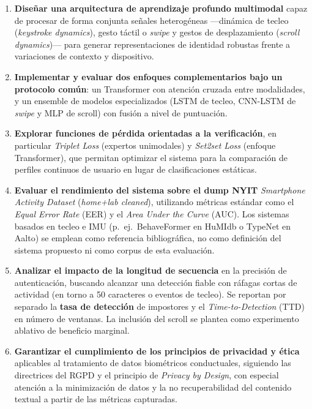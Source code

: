 \begin{enumerate}
    \item \textbf{Diseñar una arquitectura de aprendizaje profundo multimodal} capaz de procesar de forma conjunta señales heterogéneas ---dinámica de tecleo (\textit{keystroke dynamics}), gesto táctil o \textit{swipe} y gestos de desplazamiento (\textit{scroll dynamics})--- para generar representaciones de identidad robustas frente a variaciones de contexto y dispositivo.
    \item \textbf{Implementar y evaluar dos enfoques complementarios bajo un protocolo común}: un Transformer con atención cruzada entre modalidades, y un ensemble de modelos especializados (LSTM de tecleo, CNN-LSTM de \textit{swipe} y MLP de scroll) con fusión a nivel de puntuación.
    \item \textbf{Explorar funciones de pérdida orientadas a la verificación}, en particular \textit{Triplet Loss} (expertos unimodales) y \textit{Set2set Loss} (enfoque Transformer), que permitan optimizar el sistema para la comparación de perfiles continuos de usuario en lugar de clasificaciones estáticas.
    \item \textbf{Evaluar el rendimiento del sistema sobre el dump NYIT} \textit{Smartphone Activity Dataset} (\textit{home+lab cleaned}), utilizando métricas estándar como el \textit{Equal Error Rate} (EER) y el \textit{Area Under the Curve} (AUC). Los sistemas basados en tecleo e IMU (p.~ej.\ BehaveFormer en HuMIdb o TypeNet en Aalto) se emplean como referencia bibliográfica, no como definición del sistema propuesto ni como corpus de esta evaluación.
    \item \textbf{Analizar el impacto de la longitud de secuencia} en la precisión de autenticación, buscando alcanzar una detección fiable con ráfagas cortas de actividad (en torno a 50 caracteres o eventos de tecleo). Se reportan por separado la \textbf{tasa de detección} de impostores y el \textit{Time-to-Detection} (TTD) en número de ventanas. La inclusión del scroll se plantea como experimento ablativo de beneficio marginal.
    \item \textbf{Garantizar el cumplimiento de los principios de privacidad y ética} aplicables al tratamiento de datos biométricos conductuales, siguiendo las directrices del RGPD y el principio de \textit{Privacy by Design}, con especial atención a la minimización de datos y la no recuperabilidad del contenido textual a partir de las métricas capturadas.
\end{enumerate}


